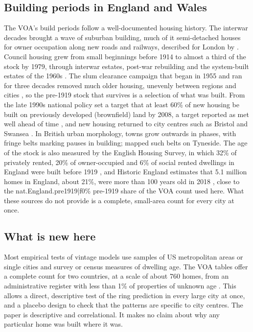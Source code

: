 \subsection{Building periods in England and Wales}
The VOA's build periods follow a well-documented housing history. The interwar decades brought a wave of suburban building, much of it semi-detached houses for owner occupation along new roads and railways, described for London by \citet{jackson1973}. Council housing grew from small beginnings before 1914 to almost a third of the stock by 1979, through interwar estates, post-war rebuilding and the system-built estates of the 1960s \citep{boughton2018}. The slum clearance campaign that began in 1955 and ran for three decades removed much older housing, unevenly between regions and cities \citep{yelling2000}, so the pre-1919 stock that survives is a selection of what was built. From the late 1990s national policy set a target that at least 60\% of new housing be built on previously developed (brownfield) land by 2008, a target reported as met well ahead of time \citep{wong2010}, and new housing returned to city centres such as Bristol and Swansea \citep{bromley2005}. In British urban morphology, towns grow outwards in phases, with fringe belts marking pauses in building; \citet{whitehand1967} mapped such belts on Tyneside. The age of the stock is also measured by the English Housing Survey, in which 32\% of privately rented, 20\% of owner-occupied and 6\% of social rented dwellings in England were built before 1919 \citep{ehs2025}, and Historic England estimates that 5.1 million homes in England, about 21\%, were more than 100 years old in 2018 \citep{historicengland2019}, close to the {{nat.England.pre1919|f0}}\% pre-1919 share of the VOA count used here. What these sources do not provide is a complete, small-area count for every city at once.

\subsection{What is new here}
Most empirical tests of vintage models use samples of US metropolitan areas or single cities and survey or census measures of dwelling age. The VOA tables offer a complete count for two countries, at a scale of about 760 homes, from an administrative register with less than 1\% of properties of unknown age \citep{voa2025bg}. This allows a direct, descriptive test of the ring prediction in every large city at once, and a placebo design to check that the patterns are specific to city centres. The paper is descriptive and correlational. It makes no claim about why any particular home was built where it was.

